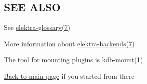 \subsection*{S\+EE A\+L\+SO}


\begin{DoxyItemize}
\item See \hyperlink{doc_help_elektra-glossary_md}{elektra-\/glossary(7)}
\item More information about \hyperlink{doc_help_elektra-backends_md}{elektra-\/backends(7)}
\item The tool for mounting plugins is \hyperlink{doc_help_kdb-mount_md}{kdb-\/mount(1)}
\item \hyperlink{README_md}{Back to main page} if you started from there 
\end{DoxyItemize}